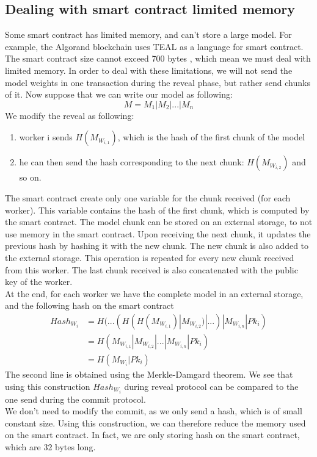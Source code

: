 \documentclass{article}
\begin{document}
\subsection{Dealing with smart contract limited memory}
Some smart contract has limited memory, and can't store a large model. For example, the Algorand blockchain uses TEAL
as a language for smart contract. The smart contract size cannot exceed 700 bytes \cite{TEAL_size}, which mean we must deal with limited
memory.
In order to deal with these limitations, we will not send the model weights in one transaction during the reveal phase,
but rather send chunks of it. Now suppose that we can write our model as following:
\begin{equation}
    M = M_1 | M_2 | ... | M_n
\end{equation}
We modify the reveal as following:
\begin{enumerate}
    \item worker i sends $H(M_{W_{i, 1}})$, which is the hash of the first chunk of the model
    \item he can then send the hash corresponding to the next chunk: $H(M_{W_{i, 2}})$ and so on.
\end{enumerate}
The smart contract create only one variable for the chunk received (for each worker). This variable contains the hash
of the first chunk, which is computed by the smart contract. The model chunk can be stored on an external storage, to
not use memory in the smart contract. Upon receiving the next chunk,
it updates the previous hash by hashing it with the new chunk. The new chunk is also added to the external storage. This
operation is repeated for every new chunk received from this worker. The last chunk received is also concatenated with
the public key of the worker.\\
At the end, for each worker we have the complete model in an external storage, and the following hash on the smart contract
\begin{equation}
    \begin{split}
         Hash_{W_i} & = H(...(H(H(M_{W_{i, 1}})|M_{W_{i, 2}})|...)|M_{W_{i, n}}|Pk_i) \\
         & = H(M_{W_{i, 1}} | M_{W_{i, 2}} | ... | M_{W_{i, n}} | Pk_i) \\
         & = H (M_{W_i} | Pk_i)
        \end{split}
\end{equation}
The second line is obtained using the Merkle-Damgard theorem. We see that using this construction
$Hash_{W_i}$ during reveal protocol can be compared to the one send during the commit protocol. \\
We don't need to modify the commit, as we only send a hash, which is of small constant size. Using this construction,
we can therefore reduce the memory used on the smart contract. In fact, we are only storing hash on the smart contract,
which are 32 bytes long.
\end{document}

